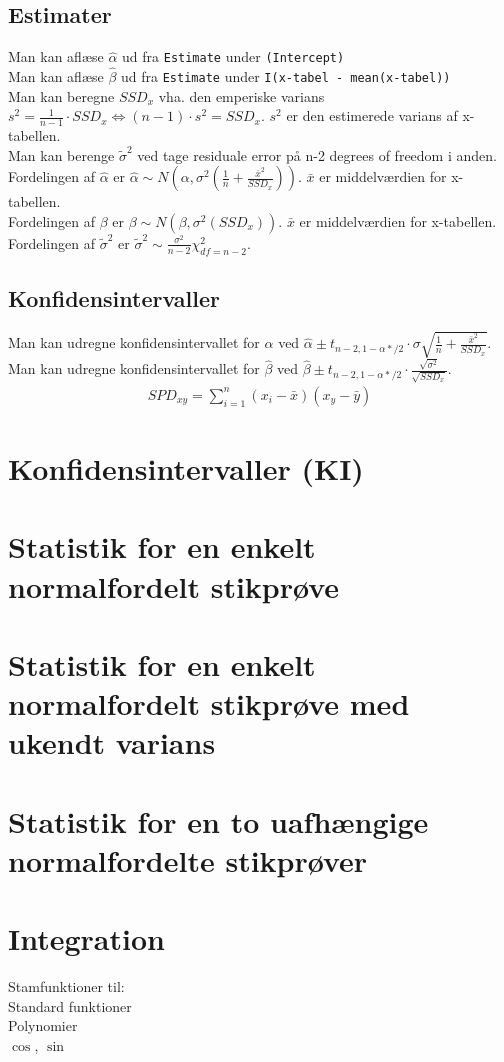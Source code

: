 \documentclass{article}
\begin{document}
\subsection*{Estimater}
Man kan aflæse $\hat{\alpha}$ ud fra \texttt{Estimate} under \texttt{(Intercept)}\\
Man kan aflæse $\hat{\beta}$ ud fra \texttt{Estimate} under \texttt{I(x-tabel - mean(x-tabel))}\\
Man kan beregne $SSD_x$ vha. den emperiske varians $s^2 = \frac{1}{n-1} \cdot SSD_x \Leftrightarrow (n-1) \cdot s^2 = SSD_x$. $s^2$ er den estimerede varians af x-tabellen.\\
Man kan berenge $\tilde{\sigma}^2$ ved tage residuale error på n-2 degrees of freedom i anden.\\
Fordelingen af $\hat{\alpha}$ er $\hat{\alpha} \sim N(\alpha, \sigma^2(\frac{1}{n} + \frac{\bar{x}^2}{SSD_x}))$. $\bar{x}$ er middelværdien for x-tabellen.\\
Fordelingen af $\beta$ er $\beta \sim N(\beta, \sigma^2(SSD_x))$. $\bar{x}$ er middelværdien for x-tabellen.\\
Fordelingen af $\tilde{\sigma}^2$ er $\tilde{\sigma}^2 \sim \frac{\sigma^2}{n-2}\chi^2_{df=n-2}$.\\
\subsection*{Konfidensintervaller}
Man kan udregne konfidensintervallet for $\hat{\alpha}$ ved $\hat{\alpha} \pm t_{n-2, 1-\alpha*/2} \cdot \sigma \sqrt{\frac{1}{n} + \frac{\bar{x}^2}{SSD_x}}$.\\
Man kan udregne konfidensintervallet for $\hat{\beta}$ ved $\hat{\beta} \pm t_{n-2, 1-\alpha*/2} \cdot \frac{\sqrt{\sigma^2}}{\sqrt{SSD_x}}$.\\


\begin{align*}
  SPD_{xy} = \sum^{n}_{i=1}{(x_i - \bar{x})(x_y - \bar{y})}
\end{align*}

\section*{Konfidensintervaller (KI)}

\section*{Statistik for en enkelt normalfordelt stikprøve}

\section*{Statistik for en enkelt normalfordelt stikprøve med ukendt varians}

\section*{Statistik for en to uafhængige normalfordelte stikprøver}
\section*{Integration}
Stamfunktioner til:\\
Standard funktioner\\
Polynomier\\
$\cos$, $\sin$
\end{document}

